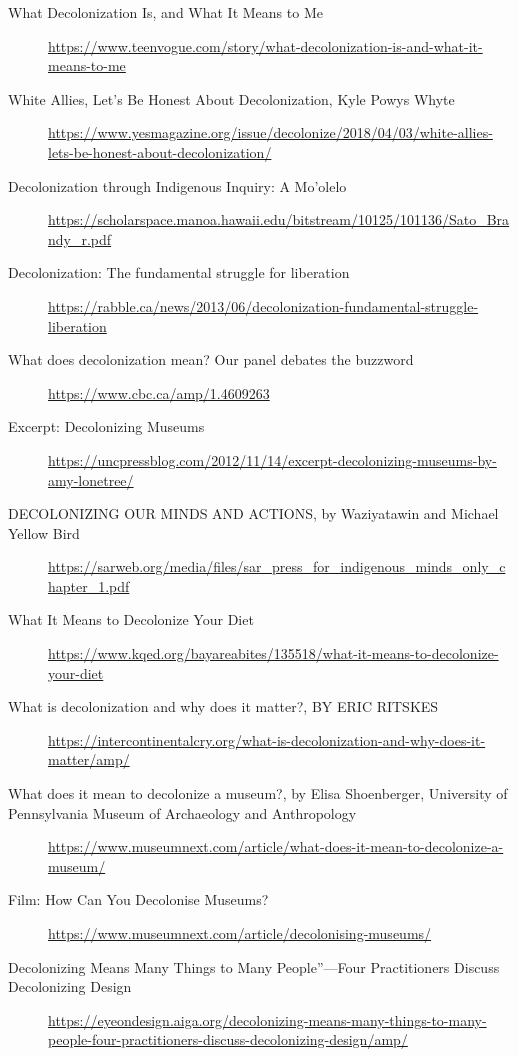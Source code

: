 \documentclass[11pt]{article}
\begin{document}
\begin{itemize}
\begin{description}
\item[{What Decolonization Is, and What It Means to Me}] \url{https://www.teenvogue.com/story/what-decolonization-is-and-what-it-means-to-me}

\item[{White Allies, Let’s Be Honest About Decolonization, Kyle Powys Whyte}] \url{https://www.yesmagazine.org/issue/decolonize/2018/04/03/white-allies-lets-be-honest-about-decolonization/}

\item[{Decolonization through Indigenous Inquiry: A Mo’olelo}] \url{https://scholarspace.manoa.hawaii.edu/bitstream/10125/101136/Sato\_Brandy\_r.pdf}

\item[{Decolonization: The fundamental struggle for liberation}] \url{https://rabble.ca/news/2013/06/decolonization-fundamental-struggle-liberation}

\item[{What does decolonization mean? Our panel debates the buzzword}] \url{https://www.cbc.ca/amp/1.4609263}

\item[{Excerpt: Decolonizing Museums}] \url{https://uncpressblog.com/2012/11/14/excerpt-decolonizing-museums-by-amy-lonetree/}

\item[{DECOLONIZING OUR MINDS AND ACTIONS, by Waziyatawin and Michael Yellow Bird}] \url{https://sarweb.org/media/files/sar\_press\_for\_indigenous\_minds\_only\_chapter\_1.pdf}

\item[{What It Means to Decolonize Your Diet}] \url{https://www.kqed.org/bayareabites/135518/what-it-means-to-decolonize-your-diet}

\item[{What is decolonization and why does it matter?, BY ERIC RITSKES}] \url{https://intercontinentalcry.org/what-is-decolonization-and-why-does-it-matter/amp/}

\item[{What does it mean to decolonize a museum?, by Elisa Shoenberger, University of Pennsylvania Museum of Archaeology and Anthropology}] \url{https://www.museumnext.com/article/what-does-it-mean-to-decolonize-a-museum/}

\item[{Film: How Can You Decolonise Museums?}] \url{https://www.museumnext.com/article/decolonising-museums/}

\item[{Decolonizing Means Many Things to Many People”—Four Practitioners Discuss Decolonizing Design}] \url{https://eyeondesign.aiga.org/decolonizing-means-many-things-to-many-people-four-practitioners-discuss-decolonizing-design/amp/}


\end{description}
\end{itemize}
\end{document}
